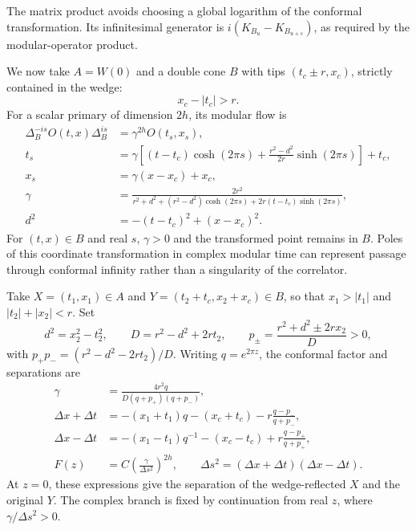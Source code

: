 \documentclass[a4paper,11pt]{article}
\theoremstyle{definition}
\begin{document}
The matrix product avoids choosing a global logarithm of the conformal transformation. Its infinitesimal generator is $i(K_{B_u}-K_{B_{u+s}})$, as required by the modular-operator product.

We now take $A=W(0)$ and a double cone $B$ with tips $(t_c\pm r,x_c)$, strictly contained in the wedge:
\[
 x_c-|t_c|>r.
\]
For a scalar primary of dimension $2h$, its modular flow is
\begin{align}
 \Delta_B^{-is}O(t,x)\Delta_B^{is}
 &=\gamma^{2h}O(t_s,x_s),
 \label{eq:ball-modular-flow}\\
 t_s&=\gamma\left[(t-t_c)\cosh(2\pi s)
       +\frac{r^2-d^2}{2r}\sinh(2\pi s)\right]+t_c,
 \label{eq:ball-time}\\
 x_s&=\gamma(x-x_c)+x_c,
 \label{eq:ball-space}\\
 \gamma&=\frac{2r^2}{r^2+d^2+(r^2-d^2)\cosh(2\pi s)
                       +2r(t-t_c)\sinh(2\pi s)},
 \label{eq:ball-conformal-factor}\\
 d^2&=-(t-t_c)^2+(x-x_c)^2.
 \label{eq:ball-distance}
\end{align}
For $(t,x)\in B$ and real $s$, $\gamma>0$ and the transformed point remains in $B$. Poles of this coordinate transformation in complex modular time can represent passage through conformal infinity rather than a singularity of the correlator.

Take $X=(t_1,x_1)\in A$ and $Y=(t_2+t_c,x_2+x_c)\in B$, so that $x_1>|t_1|$ and $|t_2|+|x_2|<r$. Set
\begin{equation}
 d^2=x_2^2-t_2^2,\qquad D=r^2-d^2+2rt_2,\qquad
 p_\pm=\frac{r^2+d^2\pm2rx_2}{D}>0,
 \label{eq:ball-parameters}
\end{equation}
with $p_+p_-=(r^2-d^2-2rt_2)/D$. Writing $q=e^{2\pi z}$, the conformal factor and separations are
\begin{align}
 \gamma&=\frac{4r^2q}{D(q+p_+)(q+p_-)},
 \label{eq:ball-gamma-factorized}\\
 \Delta x+\Delta t&=-(x_1+t_1)q-(x_c+t_c)
                       -r\frac{q-p_-}{q+p_-},
 \label{eq:ball-separation-plus}\\
 \Delta x-\Delta t&=-(x_1-t_1)q^{-1}-(x_c-t_c)
                       +r\frac{q-p_+}{q+p_+},
 \label{eq:ball-separation-minus}\\
 F(z)&=C\left(\frac{\gamma}{\Delta s^2}\right)^{2h},
 \qquad \Delta s^2=(\Delta x+\Delta t)(\Delta x-\Delta t).
 \label{eq:ball-matrix-element}
\end{align}
At $z=0$, these expressions give the separation of the wedge-reflected $X$ and the original $Y$. The complex branch is fixed by continuation from real $z$, where $\gamma/\Delta s^2>0$.
\end{document}
